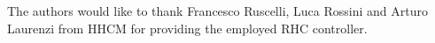 \begin{Large}
	\vskip1cm
	The authors would like to thank Francesco Ruscelli, Luca Rossini and Arturo Laurenzi from HHCM for providing the employed RHC controller.\\
	\vskip2cm
\end{Large}